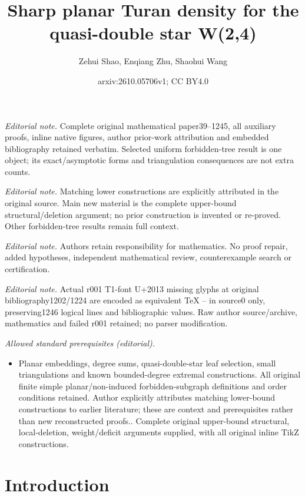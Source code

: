 \documentclass[11pt,a4paper]{article}
\title{Sharp planar Turan density for the quasi-double star W(2,4)}
\author{Zehui Shao, Enqiang Zhu, Shaohui Wang}
\date{arxiv:2610.05706v1; CC BY4.0}
\theoremstyle{remark}
\begin{document}
\maketitle
\noindent\textit{Editorial note.} Complete original mathematical paper39--1245, all auxiliary proofs, inline native figures, author prior-work attribution and embedded bibliography retained verbatim. Selected uniform forbidden-tree result is one object; its exact/asymptotic forms and triangulation consequences are not extra counts.\par\medskip
\noindent\textit{Editorial note.} Matching lower constructions are explicitly attributed in the original source. Main new material is the complete upper-bound structural/deletion argument; no prior construction is invented or re-proved. Other forbidden-tree results remain full context.\par\medskip
\noindent\textit{Editorial note.} Authors retain responsibility for mathematics. No proof repair, added hypotheses, independent mathematical review, counterexample search or certification.\par\medskip
\noindent\textit{Editorial note.} Actual r001 T1-font U+2013 missing glyphs at original bibliography1202/1224 are encoded as equivalent TeX -- in source0 only, preserving1246 logical lines and bibliographic values. Raw author source/archive, mathematics and failed r001 retained; no parser modification.\par\medskip
\noindent\textit{Allowed standard prerequisites (editorial).}\begin{itemize}
\item Planar embeddings, degree sums, quasi-double-star leaf selection, small triangulations and known bounded-degree extremal constructions. All original finite simple planar/non-induced forbidden-subgraph definitions and order conditions retained. Author explicitly attributes matching lower-bound constructions to earlier literature; these are context and prerequisites rather than new reconstructed proofs.. Complete original upper-bound structural, local-deletion, weight/deficit arguments supplied, with all original inline TikZ constructions.
\end{itemize}\medskip
\section{Introduction}
\end{document}
